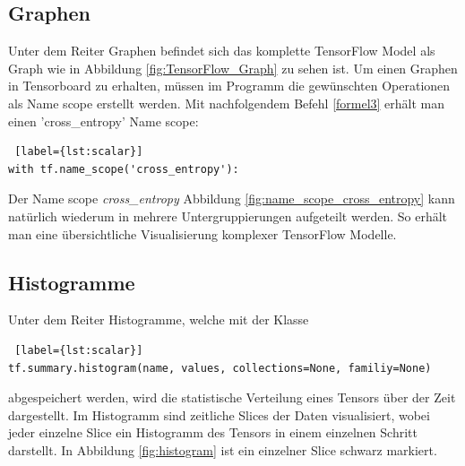 \subsection{Graphen} \label{sub:tb-graph}
\vspace{10pt}
Unter dem Reiter Graphen befindet sich das komplette TensorFlow Model als Graph wie in Abbildung \ref{fig:TensorFlow_Graph} zu sehen ist. Um einen Graphen in Tensorboard zu erhalten, müssen im Programm die gewünschten Operationen als Name scope erstellt werden. Mit nachfolgendem Befehl \ref{formel3} erhält man einen 'cross\_entropy' Name scope: 
\\

\begin{minipage}{\linewidth}
\begin{lstlisting} [label={lst:scalar}]
with tf.name_scope('cross_entropy'):
\end{lstlisting}
\end{minipage}
\vspace{0.2cm}

Der Name scope \textit{cross\_entropy} Abbildung \ref{fig:name_scope_cross_entropy} kann natürlich wiederum in mehrere Untergruppierungen aufgeteilt werden. So erhält man eine übersichtliche Visualisierung komplexer TensorFlow Modelle. 






\subsection{Histogramme}
\vspace{10pt}
Unter dem Reiter Histogramme, welche mit der Klasse
\\

\begin{minipage}{\linewidth}
\begin{lstlisting} [label={lst:scalar}]
tf.summary.histogram(name, values, collections=None, familiy=None)
\end{lstlisting}
\end{minipage}
\vspace{0.2cm}


abgespeichert werden, wird die statistische Verteilung eines Tensors über der Zeit dargestellt. Im Histogramm sind zeitliche \dq Slices\grqq{} der Daten visualisiert, wobei jeder einzelne Slice ein Histogramm des Tensors in einem einzelnen Schritt darstellt. In Abbildung \ref{fig:histogram} ist ein einzelner Slice schwarz markiert.

